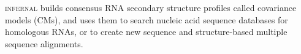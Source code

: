 \textsc{infernal} builds consensus RNA secondary structure profiles
called covariance models (CMs), and uses them to search nucleic acid
sequence databases for homologous RNAs, or to create new sequence and
structure-based multiple sequence alignments.
